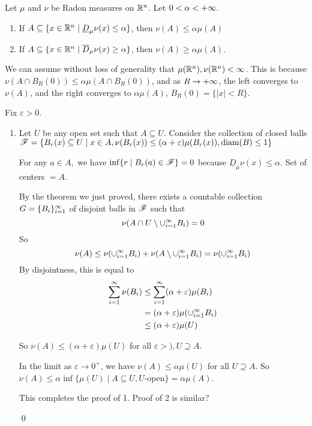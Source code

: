 \documentclass[x11names,reqno,14pt]{extarticle}
\newcommand{\seq}[2][\oo]{_{#2 = 1}^#1}
\newcommand{\cupi}[1][\oo]{\cup\seq[#1]{i}}
\DeclareMathOperator{\diam}{diam}
\begin{document}
\lem

Let $\mu$ and $\nu$ be Radon measures on $\mathbb{R}^n$. Let $0 < \alpha < +\infty$. 

\begin{enumerate}[label=(\roman*)]

\item If $A \subseteq \{x\in\mathbb{R}^n\mid\underline{D}_\mu\nu(x)\leq\alpha\}$, then $\nu(A)\leq\alpha\mu(A)$

\item If $A \subseteq \{x\in\mathbb{R}^n\mid\overline{D}_\mu\nu(x)\geq\alpha\}$, then $\nu(A)\geq\alpha\mu(A)$. 

\end{enumerate}

\proof

We can assume without loss of generality that $\mu(\mathbb{R}^n),\nu(\mathbb{R}^n)<\infty$. This is because $\nu(A \cap B_R(0)) \leq \alpha\mu(A \cap B_R(0))$, and as $R\to+\infty$, the left converges to $\nu(A)$, and the right converges to $\alpha\mu(A)$, $B_R(0) = \{|x|<R\}$. 

Fix $\varepsilon>0$. 

\begin{enumerate}[label=(\roman*)]

\item Let $U$ be any open set such that $A \subseteq U$. Consider the collection of closed balls $\ms{F} = \{B_r(x) \subseteq U \mid x\in A,\nu(B_r(x)) \leq (\alpha + \varepsilon)\mu(B_r(x)), \diam(B)\leq1\}$

For any $a \in A,$ we have $\inf\{r\mid B_r(a)\in\mathscr{F} \} = 0$ because $\underline{D}_\mu\nu(x)\leq\alpha$. Set of centers $=A$. 

By the theorem we just proved, there exists a countable collection $G = \{B_i\}\seq{i}$ of disjoint balls in $\mathscr{F}$ such that
\[
\nu(A\cap U \setminus\cupi B_i) = 0
\]
So
\[
\nu(A)\leq\nu(\cupi B_i) + \nu(A\setminus \cupi B_i) = \nu(\cupi B_i)
\]
By disjointness, this is equal to 
\begin{align*}
\sum\seq{i}\nu(B_i) & \leq\sum\seq{i}(\alpha+\varepsilon)\mu(B_i) \\
& = (\alpha + \varepsilon)\mu(\cupi B_i) \\
& \leq (\alpha + \varepsilon)\mu(U) \\
\end{align*}

So $\nu(A)\leq(\alpha+\varepsilon)\mu(U)$ for all $\varepsilon > ), U \supseteq A$. 

In the limit as $\varepsilon\to0^+$, we have $\nu(A)\leq\alpha\mu(U)$ for all $U \supseteq A$. So $\nu(A) \leq \alpha\inf\{\mu(U)\mid A \subseteq U, U$-open$\} = \alpha\mu(A)$. 

This completes the proof of 1. Proof of 2 is similar? 

\qed

\end{enumerate}
\end{document}
